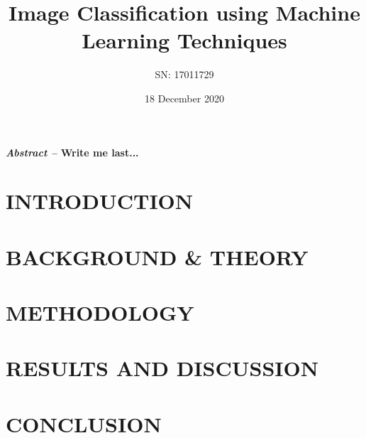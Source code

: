 \documentclass[a4paper,11pt,twocolumn]{article}
\begin{document}
	\title{\Large{\textbf{Image Classification using Machine Learning Techniques}}}
	\author{SN: 17011729}
	\date{18 December 2020}
	
	\maketitle
	
	\textbf{\textit{Abstract -- } Write me last...}
	
	\section{INTRODUCTION}
	
	\section{BACKGROUND \& THEORY}	
		
	\section{METHODOLOGY}
		
	\section{RESULTS AND DISCUSSION}
	
	\section{CONCLUSION}
\end{document}
